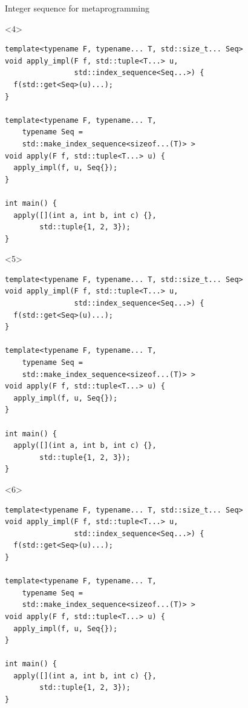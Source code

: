 \documentclass[10pt]{beamer}
\begin{document}
\begin{frame}[fragile]{Integer sequence for metaprogramming}
\begin{onlyenv}<4>
	\begin{verbatim}
template<typename F, typename... T, std::size_t... Seq>
void apply_impl(F f, std::tuple<T...> u,
                std::index_sequence<Seq...>) {
  f(std::get<Seq>(u)...);
}

template<typename F, typename... T,
    typename Seq =
    std::make_index_sequence<sizeof...(T)> >
void apply(F f, std::tuple<T...> u) {
  apply_impl(f, u, Seq{});
}

int main() {
  apply([](int a, int b, int c) {},
        std::tuple{1, 2, 3});
}
	\end{verbatim}
\end{onlyenv}

\begin{onlyenv}<5>
	\begin{verbatim}
template<typename F, typename... T, std::size_t... Seq>
void apply_impl(F f, std::tuple<T...> u,
                std::index_sequence<Seq...>) {
  f(std::get<Seq>(u)...);
}

template<typename F, typename... T,
    typename Seq =
    std::make_index_sequence<sizeof...(T)> >
void apply(F f, std::tuple<T...> u) {
  apply_impl(f, u, Seq{});
}

int main() {
  apply([](int a, int b, int c) {},
        std::tuple{1, 2, 3});
}
	\end{verbatim}
\end{onlyenv}

\begin{onlyenv}<6>
	\begin{verbatim}
template<typename F, typename... T, std::size_t... Seq>
void apply_impl(F f, std::tuple<T...> u,
                std::index_sequence<Seq...>) {
  f(std::get<Seq>(u)...);
}

template<typename F, typename... T,
    typename Seq =
    std::make_index_sequence<sizeof...(T)> >
void apply(F f, std::tuple<T...> u) {
  apply_impl(f, u, Seq{});
}

int main() {
  apply([](int a, int b, int c) {},
        std::tuple{1, 2, 3});
}
	\end{verbatim}
\end{onlyenv}

\end{frame}
\end{document}

